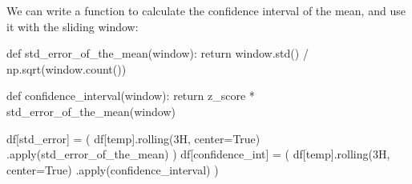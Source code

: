 \documentclass[
  letterpaper,
  DIV=11,
  numbers=noendperiod,
  oneside]{scrreprt}
\newenvironment{Shaded}{\begin{snugshade}}{\end{snugshade}}
\newcommand{\BuiltInTok}[1]{\textcolor[rgb]{0.00,0.23,0.31}{#1}}
\newcommand{\ControlFlowTok}[1]{\textcolor[rgb]{0.00,0.23,0.31}{#1}}
\newcommand{\KeywordTok}[1]{\textcolor[rgb]{0.00,0.23,0.31}{#1}}
\newcommand{\NormalTok}[1]{\textcolor[rgb]{0.00,0.23,0.31}{#1}}
\newcommand{\OperatorTok}[1]{\textcolor[rgb]{0.37,0.37,0.37}{#1}}
\newcommand{\StringTok}[1]{\textcolor[rgb]{0.13,0.47,0.30}{#1}}
\newcommand{\VariableTok}[1]{\textcolor[rgb]{0.07,0.07,0.07}{#1}}
\begin{document}
We can write a function to calculate the confidence interval of the
mean, and use it with the sliding window:

\begin{Shaded}
\begin{Highlighting}[]
\KeywordTok{def}\NormalTok{ std\_error\_of\_the\_mean(window):}
    \ControlFlowTok{return}\NormalTok{ window.std() }\OperatorTok{/}\NormalTok{ np.sqrt(window.count())}

\KeywordTok{def}\NormalTok{ confidence\_interval(window):}
    \ControlFlowTok{return}\NormalTok{ z\_score }\OperatorTok{*}\NormalTok{ std\_error\_of\_the\_mean(window)}

\NormalTok{df[}\StringTok{\textquotesingle{}std\_error\textquotesingle{}}\NormalTok{] }\OperatorTok{=}\NormalTok{ (}
\NormalTok{                   df[}\StringTok{\textquotesingle{}temp\textquotesingle{}}\NormalTok{].rolling(}\StringTok{\textquotesingle{}3H\textquotesingle{}}\NormalTok{,}
\NormalTok{                                      center}\OperatorTok{=}\VariableTok{True}\NormalTok{)}
\NormalTok{                             .}\BuiltInTok{apply}\NormalTok{(std\_error\_of\_the\_mean)}
\NormalTok{                  )}
\NormalTok{df[}\StringTok{\textquotesingle{}confidence\_int\textquotesingle{}}\NormalTok{] }\OperatorTok{=}\NormalTok{ (}
\NormalTok{                        df[}\StringTok{\textquotesingle{}temp\textquotesingle{}}\NormalTok{].rolling(}\StringTok{\textquotesingle{}3H\textquotesingle{}}\NormalTok{,}
\NormalTok{                                           center}\OperatorTok{=}\VariableTok{True}\NormalTok{)}
\NormalTok{                                  .}\BuiltInTok{apply}\NormalTok{(confidence\_interval)}
\NormalTok{                       )}
\end{Highlighting}
\end{Shaded}
\end{document}
